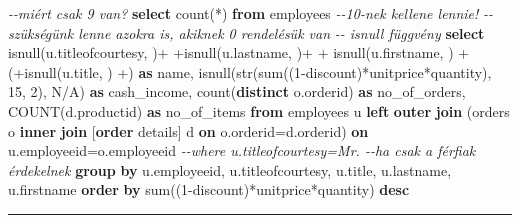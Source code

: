 \documentclass[
  magyar,
]{article}
\newenvironment{Shaded}{}{}
\newcommand{\CommentTok}[1]{\textcolor[rgb]{0.38,0.63,0.69}{\textit{#1}}}
\newcommand{\DecValTok}[1]{\textcolor[rgb]{0.25,0.63,0.44}{#1}}
\newcommand{\FunctionTok}[1]{\textcolor[rgb]{0.02,0.16,0.49}{#1}}
\newcommand{\KeywordTok}[1]{\textcolor[rgb]{0.00,0.44,0.13}{\textbf{#1}}}
\newcommand{\NormalTok}[1]{#1}
\newcommand{\OperatorTok}[1]{\textcolor[rgb]{0.40,0.40,0.40}{#1}}
\newcommand{\StringTok}[1]{\textcolor[rgb]{0.25,0.44,0.63}{#1}}
\begin{document}
\begin{Shaded}
\begin{Highlighting}[]
\CommentTok{{-}{-}miért csak 9 van?}
\KeywordTok{select} \FunctionTok{count}\NormalTok{(}\OperatorTok{*}\NormalTok{) }\KeywordTok{from}\NormalTok{ employees}
\CommentTok{{-}{-}10{-}nek kellene lennie!}
\CommentTok{{-}{-}szükségünk lenne azokra is, akiknek 0 rendelésük van}
\CommentTok{{-}{-} isnull függvény}
\KeywordTok{select}\NormalTok{ isnull(u.titleofcourtesy, }\StringTok{\textquotesingle{}\textquotesingle{}}\NormalTok{)}\OperatorTok{+}\StringTok{\textquotesingle{} \textquotesingle{}}\OperatorTok{+}\NormalTok{isnull(u.lastname, }\StringTok{\textquotesingle{}\textquotesingle{}}\NormalTok{)}\OperatorTok{+}\StringTok{\textquotesingle{} \textquotesingle{}}\OperatorTok{+}\NormalTok{ isnull(u.firstname,}
\StringTok{\textquotesingle{}\textquotesingle{}}\NormalTok{) }\OperatorTok{+}\StringTok{\textquotesingle{} (\textquotesingle{}}\OperatorTok{+}\NormalTok{isnull(u.title, }\StringTok{\textquotesingle{}\textquotesingle{}}\NormalTok{) }\OperatorTok{+}\StringTok{\textquotesingle{})\textquotesingle{}} \KeywordTok{as}\NormalTok{ name,}
\NormalTok{isnull(str(}\FunctionTok{sum}\NormalTok{((}\DecValTok{1}\OperatorTok{{-}}\NormalTok{discount)}\OperatorTok{*}\NormalTok{unitprice}\OperatorTok{*}\NormalTok{quantity), }\DecValTok{15}\NormalTok{, }\DecValTok{2}\NormalTok{), }\StringTok{\textquotesingle{}N/A\textquotesingle{}}\NormalTok{) }\KeywordTok{as}\NormalTok{ cash\_income,}
\FunctionTok{count}\NormalTok{(}\KeywordTok{distinct}\NormalTok{ o.orderid) }\KeywordTok{as}\NormalTok{ no\_of\_orders, }\FunctionTok{COUNT}\NormalTok{(d.productid) }\KeywordTok{as}\NormalTok{ no\_of\_items}
\KeywordTok{from}\NormalTok{ employees u }\KeywordTok{left} \KeywordTok{outer} \KeywordTok{join}
\NormalTok{(orders o }\KeywordTok{inner} \KeywordTok{join}\NormalTok{ [}\KeywordTok{order}\NormalTok{ details] d }\KeywordTok{on}\NormalTok{ o.orderid}\OperatorTok{=}\NormalTok{d.orderid)}
\KeywordTok{on}\NormalTok{ u.employeeid}\OperatorTok{=}\NormalTok{o.employeeid}
\CommentTok{{-}{-}where u.titleofcourtesy=\textquotesingle{}Mr.\textquotesingle{} {-}{-}ha csak a férfiak érdekelnek}
\KeywordTok{group} \KeywordTok{by}\NormalTok{ u.employeeid, u.titleofcourtesy, u.title, u.lastname, u.firstname}
\KeywordTok{order} \KeywordTok{by} \FunctionTok{sum}\NormalTok{((}\DecValTok{1}\OperatorTok{{-}}\NormalTok{discount)}\OperatorTok{*}\NormalTok{unitprice}\OperatorTok{*}\NormalTok{quantity) }\KeywordTok{desc}
\end{Highlighting}
\end{Shaded}

\begin{center}\rule{0.5\linewidth}{0.5pt}\end{center}
\end{document}

